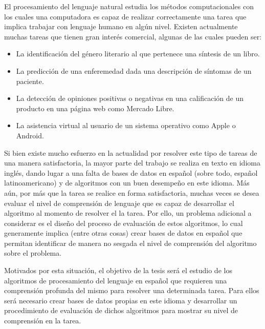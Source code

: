 El procesamiento del lenguaje natural estudia los métodos computacionales con los cuales una computadora es capaz de realizar correctamente una tarea que implica trabajar con lenguaje humano en algún nivel. Existen actualmente muchas tareas que tienen gran interés comercial, algunas de las cuales pueden ser:
\begin{itemize}
    \item La identificación del género literario al que pertenece una síntesis de un libro.
    \item La predicción de una enferemedad dada una descripción de síntomas de un paciente.
    \item La detección de opiniones positivas o negativas en una calificación de un producto en una página web como Mercado Libre.
    \item La asistencia virtual al usuario de un sistema operativo como Apple o Android. 
\end{itemize} 

Si bien existe mucho esfuerzo en la actualidad por resolver este tipo de tareas de una manera satisfactoria, la mayor parte del trabajo se realiza en texto en idioma inglés, dando lugar a una falta de bases de datos en español (sobre todo, español latinoamericano) y de algoritmos con un buen desempeño en este idioma. Más aún, por más que la tarea se realice en forma satisfactoria, muchas veces se desea evaluar el nivel de comprensión de lenguaje que es capaz de desarrollar el algoritmo al momento de resolver el la tarea. Por ello, un problema adicional a considerar es el diseño del proceso de evaluación de estos algoritmos, lo cual generamente implica (entre otras cosas) crear bases de datos en español que permitan identificar de manera no sesgada el nivel de comprensión del algoritmo sobre el problema.

Motivados por esta situación, el objetivo de la tesis será el estudio de los algoritmos de procesamiento del lenguaje en español que requieren una comprensión profunda del mismo para resolver una determinada tarea. Para ellos será necesario crear bases de datos propias en este idioma y desarrollar un procedimiento de evaluación de dichos algoritmos para mostrar su nivel de comprensión en la tarea.